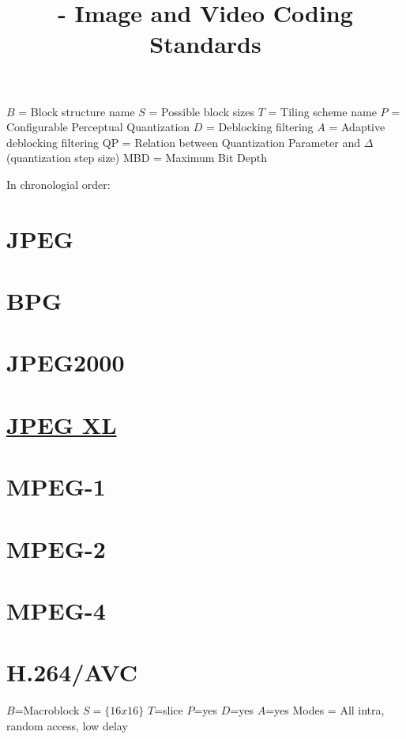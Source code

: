 
\title{\SM{} - Image and Video Coding Standards}

\maketitle

\tableofcontents

$B$ = Block structure name
$S$ = Possible block sizes
$T$ = Tiling scheme name
$P$ = Configurable Perceptual Quantization
$D$ = Deblocking filtering
$A$ = Adaptive deblocking filtering
QP = Relation between Quantization Parameter and $\Delta$ (quantization step size)
MBD = Maximum Bit Depth

In chronologial order:

\section{JPEG}

\section{BPG}

\section{JPEG2000}

\section{ \href{https://en.wikipedia.org/wiki/JPEG_XL}{JPEG XL}}

\section{MPEG-1}

\section{MPEG-2}

\section{MPEG-4}

\section{H.264/AVC}

$B$=Macroblock
$S=\{16x16\}$
$T$=slice
$P$=yes
$D$=yes
$A$=yes
Modes = All intra, random access, low delay

